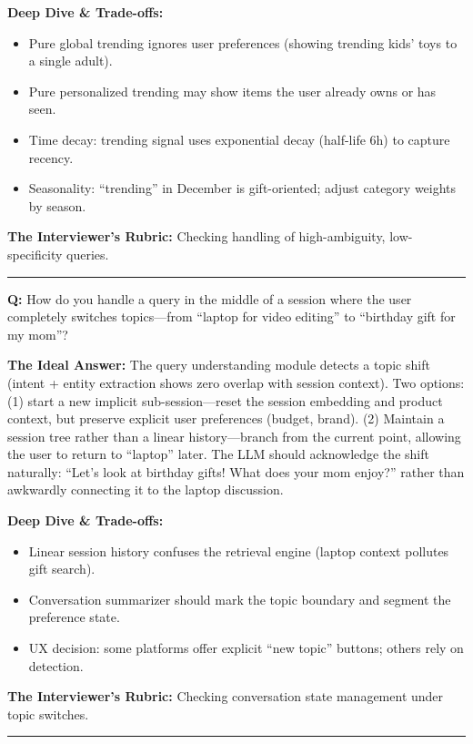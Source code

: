 \textbf{Deep Dive \& Trade-offs:}
\begin{itemize}
  \item Pure global trending ignores user preferences (showing trending kids' toys to a single adult).
  \item Pure personalized trending may show items the user already owns or has seen.
  \item Time decay: trending signal uses exponential decay (half-life 6h) to capture recency.
  \item Seasonality: ``trending'' in December is gift-oriented; adjust category weights by season.
\end{itemize}

\textbf{The Interviewer's Rubric:} Checking handling of high-ambiguity, low-specificity queries.

\bigskip\hrule\bigskip

\textbf{Q:} How do you handle a query in the middle of a session where the user completely switches topics---from ``laptop for video editing'' to ``birthday gift for my mom''?

\textbf{The Ideal Answer:} The query understanding module detects a topic shift (intent + entity extraction shows zero overlap with session context). Two options: (1) start a new implicit sub-session---reset the session embedding and product context, but preserve explicit user preferences (budget, brand). (2) Maintain a session tree rather than a linear history---branch from the current point, allowing the user to return to ``laptop'' later. The LLM should acknowledge the shift naturally: ``Let's look at birthday gifts! What does your mom enjoy?'' rather than awkwardly connecting it to the laptop discussion.

\textbf{Deep Dive \& Trade-offs:}
\begin{itemize}
  \item Linear session history confuses the retrieval engine (laptop context pollutes gift search).
  \item Conversation summarizer should mark the topic boundary and segment the preference state.
  \item UX decision: some platforms offer explicit ``new topic'' buttons; others rely on detection.
\end{itemize}

\textbf{The Interviewer's Rubric:} Checking conversation state management under topic switches.

\bigskip\hrule\bigskip

